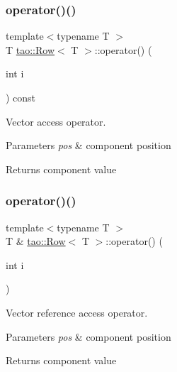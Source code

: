 \subsubsection{\texorpdfstring{operator()()}{operator()()}\hspace{0.1cm}{\footnotesize\ttfamily [1/2]}}
{\footnotesize\ttfamily template$<$typename T $>$ \\
T \mbox{\hyperlink{classtao_1_1_row}{tao\+::\+Row}}$<$ T $>$\+::operator() (\begin{DoxyParamCaption}\item[{int}]{i }\end{DoxyParamCaption}) const}



Vector access operator. 


\begin{DoxyParams}{Parameters}
{\em pos} & component position \\
\hline
\end{DoxyParams}
\begin{DoxyReturn}{Returns}
component value 
\end{DoxyReturn}
\mbox{\label{classtao_1_1_row_a170d8864b87f6fdfa1ecb81f6b698171}} 
\subsubsection{\texorpdfstring{operator()()}{operator()()}\hspace{0.1cm}{\footnotesize\ttfamily [2/2]}}
{\footnotesize\ttfamily template$<$typename T $>$ \\
T \& \mbox{\hyperlink{classtao_1_1_row}{tao\+::\+Row}}$<$ T $>$\+::operator() (\begin{DoxyParamCaption}\item[{int}]{i }\end{DoxyParamCaption})}



Vector reference access operator. 


\begin{DoxyParams}{Parameters}
{\em pos} & component position \\
\hline
\end{DoxyParams}
\begin{DoxyReturn}{Returns}
component value 
\end{DoxyReturn}
\mbox{\label{classtao_1_1_row_acc133027f920c93aa8e2e60f9fb2dab0}} 
